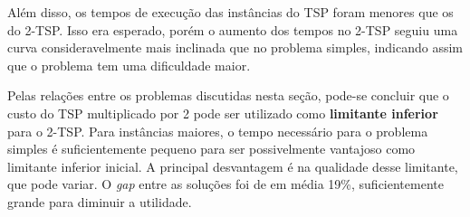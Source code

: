 \documentclass{TEMA}
\begin{document}
         Além disso, os tempos de execução das instâncias do TSP foram menores que os do 2-TSP. Isso era esperado, porém o aumento dos tempos no 2-TSP seguiu uma curva consideravelmente mais inclinada que no problema simples, indicando assim que o problema tem uma dificuldade maior.
         
         Pelas relações entre os problemas discutidas nesta seção, pode-se concluir que o custo do TSP multiplicado por 2 pode ser utilizado como \textbf{limitante inferior} para o 2-TSP. Para instâncias maiores, o tempo necessário para o problema simples é suficientemente pequeno para ser possivelmente vantajoso como limitante inferior inicial. A principal desvantagem é na qualidade desse limitante, que pode variar. O \textit{gap} entre as soluções foi de em média 19\%, suficientemente grande para diminuir a utilidade.
\end{document}
